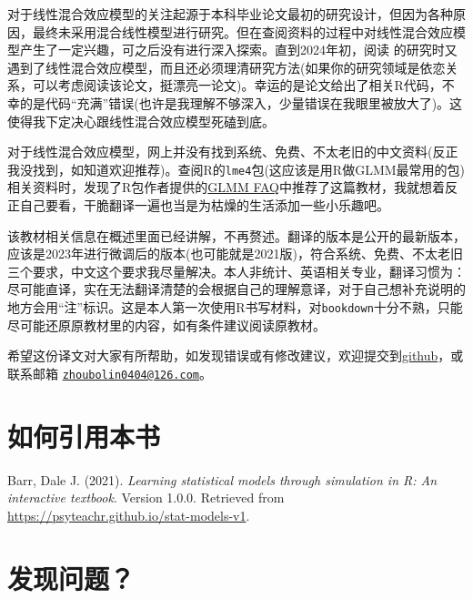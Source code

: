 \documentclass[
]{book}
\begin{document}
对于线性混合效应模型的关注起源于本科毕业论文最初的研究设计，但因为各种原因，最终未采用混合线性模型进行研究。但在查阅资料的过程中对线性混合效应模型产生了一定兴趣，可之后没有进行深入探索。直到2024年初，阅读 \citet{Fraley_et_al_2021} 的研究时又遇到了线性混合效应模型，而且还必须理清研究方法(如果你的研究领域是依恋关系，可以考虑阅读该论文，挺漂亮一论文)。幸运的是论文给出了相关R代码，不幸的是代码``充满''错误(也许是我理解不够深入，少量错误在我眼里被放大了)。这使得我下定决心跟线性混合效应模型死磕到底。

对于线性混合效应模型，网上并没有找到系统、免费、不太老旧的中文资料(反正我没找到，如知道欢迎推荐)。查阅R的\texttt{lme4}包(这应该是用R做GLMM最常用的包)相关资料时，发现了R包作者提供的\href{https://bbolker.github.io/mixedmodels-misc/glmmFAQ.html}{GLMM FAQ}中推荐了这篇教材，我就想着反正自己要看，干脆翻译一遍也当是为枯燥的生活添加一些小乐趣吧。

该教材相关信息在概述里面已经讲解，不再赘述。翻译的版本是公开的最新版本，应该是2023年进行微调后的版本(也可能就是2021版)，符合系统、免费、不太老旧三个要求，中文这个要求我尽量解决。本人非统计、英语相关专业，翻译习惯为：尽可能直译，实在无法翻译清楚的会根据自己的理解意译，对于自己想补充说明的地方会用``注''标识。这是本人第一次使用R书写材料，对\texttt{bookdown}十分不熟，只能尽可能还原原教材里的内容，如有条件建议阅读原教材。

希望这份译文对大家有所帮助，如发现错误或有修改建议，欢迎提交到\href{https://github.com/zhoubolin0404/Learning_Statistical_Models_Through_Simulation_in_R/issues}{github}，或联系邮箱 \href{mailto:zhoubolin0404@126.com}{\nolinkurl{zhoubolin0404@126.com}}。

\hypertarget{ux5982ux4f55ux5f15ux7528ux672cux4e66}{%
\section*{如何引用本书}\label{ux5982ux4f55ux5f15ux7528ux672cux4e66}}

Barr, Dale J. (2021). \emph{Learning statistical models through simulation in R: An interactive textbook}. Version 1.0.0. Retrieved from \url{https://psyteachr.github.io/stat-models-v1}.

\hypertarget{ux53d1ux73b0ux95eeux9898}{%
\section*{发现问题？}\label{ux53d1ux73b0ux95eeux9898}}
\end{document}
